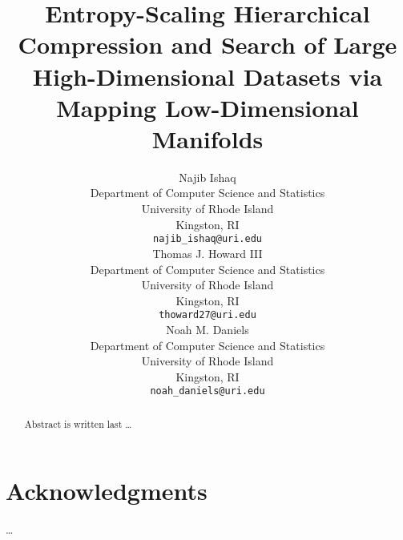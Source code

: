 \documentclass{article}
\title{Entropy-Scaling Hierarchical Compression and Search of Large High-Dimensional Datasets via Mapping Low-Dimensional Manifolds}
\author{
    Najib Ishaq \\
    Department of Computer Science and Statistics\\
    University of Rhode Island \\
    Kingston, RI \\
    \texttt{najib\_ishaq@uri.edu} \\
    \And
    Thomas J. Howard III \\
    Department of Computer Science and Statistics\\
    University of Rhode Island\\
    Kingston, RI\\
    \texttt{thoward27@uri.edu} \\
    \AND
    Noah M. Daniels \\
    Department of Computer Science and Statistics\\
    University of Rhode Island\\
    Kingston, RI\\
    \texttt{noah\_daniels@uri.edu} \\
}
\date{}
\begin{document}
    \maketitle
    \begin{abstract}
        Abstract is written last \dots
    \end{abstract}


    
    
    
    
    
    

    \section*{Acknowledgments}

    \dots

    \FloatBarrier
      
    
\end{document}
